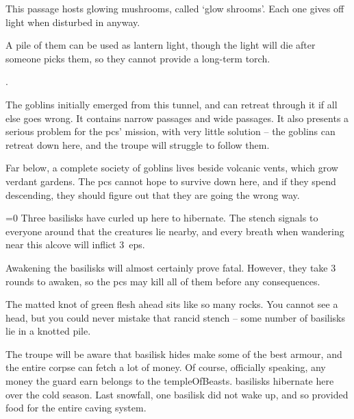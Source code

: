 \begin{multicols}{2}


This passage hosts glowing mushrooms, called `glow shrooms'.%
Each one gives off light when disturbed in anyway.

A pile of them can be used as lantern light, though the light will die after  someone picks them, so they cannot provide a long-term torch.


.


The goblins initially emerged from this tunnel, and can retreat through it if all else goes wrong.
It contains narrow passages and wide passages.
It also presents a serious problem for the \glspl{pc}' mission, with very little solution -- the goblins can retreat down here, and the troupe will struggle to follow them.

Far below, a complete society of goblins lives beside volcanic vents, which grow verdant gardens.
The \glspl{pc} cannot hope to survive down here, and if they spend  descending, they should figure out that they are going the wrong way.


\ifnum\value{temperature}=0
  Three \glspl{basilisk} have curled up here to hibernate.
  The stench signals to everyone around that the creatures lie nearby, and every breath when wandering near this alcove will inflict 3~\glspl{ep}.

  Awakening the \glspl{basilisk} will almost certainly prove fatal.
  However, they take 3 rounds to awaken, so the \glspl{pc} may kill all of them before any consequences.

  \begin{boxtext}
    The matted knot of green flesh ahead sits like so many rocks.
    You cannot see a head, but you could never mistake that rancid stench -- some number of \glspl{basilisk} lie in a knotted pile.
  \end{boxtext}


  The troupe will be aware that \gls{basilisk} hides make some of the best armour, and the entire corpse can fetch a lot of money.
  Of course, officially speaking, any money the \gls{guard} earn belongs to the \gls{templeOfBeasts}.%
\else
  \Glspl{basilisk} hibernate here over the cold season.
  Last snowfall, one \gls{basilisk} did not wake up, and so provided food for the entire caving system.


\end{multicols}
